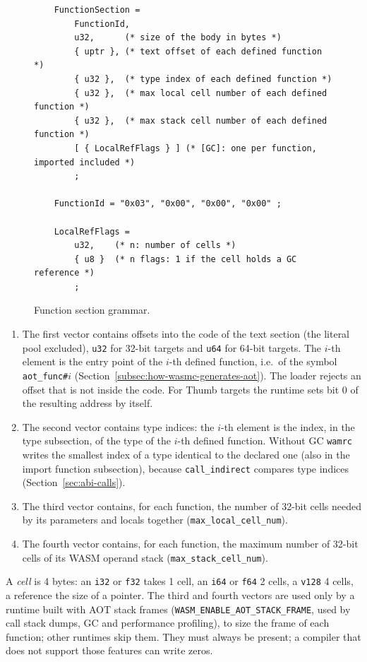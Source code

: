 \documentclass{article}
\begin{document}
\begin{figure}[H]
\begin{verbatim}
    FunctionSection =
        FunctionId,
        u32,      (* size of the body in bytes *)
        { uptr }, (* text offset of each defined function *)
        { u32 },  (* type index of each defined function *)
        { u32 },  (* max local cell number of each defined function *)
        { u32 },  (* max stack cell number of each defined function *)
        [ { LocalRefFlags } ] (* [GC]: one per function, imported included *)
        ;

    FunctionId = "0x03", "0x00", "0x00", "0x00" ;

    LocalRefFlags =
        u32,    (* n: number of cells *)
        { u8 }  (* n flags: 1 if the cell holds a GC reference *)
        ;
\end{verbatim}
\caption{Function section grammar.}
\label{fig:function-section-grammar}
\end{figure}

\begin{enumerate}
    \item The first vector contains offsets into the code of the text section (the literal pool excluded), \verb|u32| for 32-bit targets and \verb|u64| for 64-bit targets.
        The $i$-th element is the entry point of the $i$-th defined function, i.e.\ of the symbol \verb|aot_func#|$i$ (Section~\ref{subsec:how-wasmc-generates-aot}).
        The loader rejects an offset that is not inside the code.
        For Thumb targets the runtime sets bit 0 of the resulting address by itself.
    \item The second vector contains type indices: the $i$-th element is the index, in the type subsection, of the type of the $i$-th defined function.
        Without GC \texttt{wamrc} writes the smallest index of a type identical to the declared one (also in the import function subsection), because \verb|call_indirect| compares type indices (Section~\ref{sec:abi-calls}).
    \item The third vector contains, for each function, the number of 32-bit cells needed by its parameters and locals together (\verb|max_local_cell_num|).
    \item The fourth vector contains, for each function, the maximum number of 32-bit cells of its WASM operand stack (\verb|max_stack_cell_num|).
\end{enumerate}
A \emph{cell} is 4 bytes: an \verb|i32| or \verb|f32| takes 1 cell, an \verb|i64| or \verb|f64| 2 cells, a \verb|v128| 4 cells, a reference the size of a pointer.
The third and fourth vectors are used only by a runtime built with AOT stack frames (\verb|WASM_ENABLE_AOT_STACK_FRAME|, used by call stack dumps, GC and performance profiling), to size the frame of each function; other runtimes skip them.
They must always be present; a compiler that does not support those features can write zeros.
\end{document}
